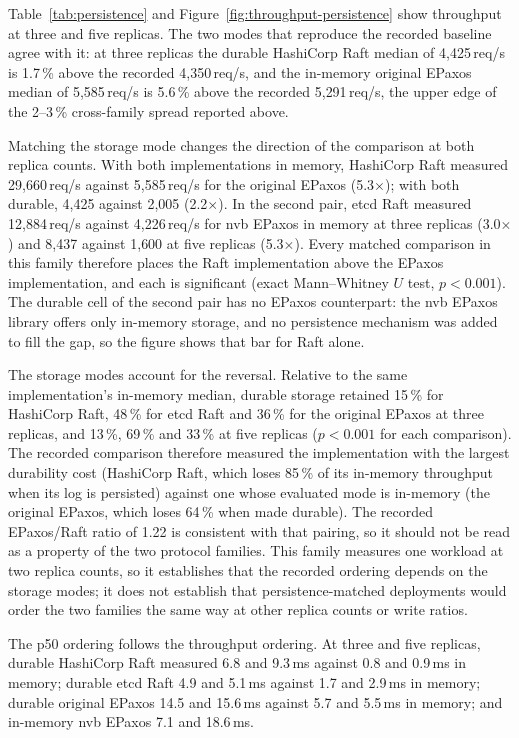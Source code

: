 Table~\ref{tab:persistence} and
Figure~\ref{fig:throughput-persistence} show throughput at three and five
replicas. The two modes that reproduce the recorded baseline agree with it: at
three replicas the durable HashiCorp Raft median of 4{,}425\,req/s is
1.7\,\% above the recorded 4{,}350\,req/s, and the in-memory original EPaxos
median of 5{,}585\,req/s is 5.6\,\% above the recorded 5{,}291\,req/s, the
upper edge of the 2--3\,\% cross-family spread reported above.

Matching the storage mode changes the direction of the comparison at both
replica counts. With both implementations in memory, HashiCorp Raft measured
29{,}660\,req/s against 5{,}585\,req/s for the original EPaxos (5.3$\times$);
with both durable, 4{,}425 against 2{,}005 (2.2$\times$). In the second pair,
etcd Raft measured 12{,}884\,req/s against 4{,}226\,req/s for nvb EPaxos in
memory at three replicas (3.0$\times$) and 8{,}437 against 1{,}600 at five
replicas (5.3$\times$). Every matched comparison in this family therefore
places the Raft implementation above the EPaxos implementation, and each is
significant (exact Mann--Whitney $U$ test, $p<0.001$). The durable cell of the
second pair has no EPaxos counterpart: the nvb EPaxos library offers only
in-memory storage, and no persistence mechanism was added to fill the gap, so
the figure shows that bar for Raft alone.

The storage modes account for the reversal. Relative to the same
implementation's in-memory median, durable storage retained 15\,\% for
HashiCorp Raft, 48\,\% for etcd Raft and 36\,\% for the original EPaxos at
three replicas, and 13\,\%, 69\,\% and 33\,\% at five replicas ($p<0.001$ for
each comparison). The recorded comparison therefore measured the
implementation with the largest durability cost (HashiCorp Raft, which loses
85\,\% of its in-memory throughput when its log is persisted) against one
whose evaluated mode is in-memory (the original EPaxos, which loses 64\,\%
when made durable). The recorded EPaxos/Raft ratio of 1.22 is consistent with
that pairing, so it should not be read as a property of the two protocol
families. This family measures one workload at two replica counts, so it
establishes that the recorded ordering depends on the storage modes; it does
not establish that persistence-matched deployments would order the two
families the same way at other replica counts or write ratios.

The p50 ordering follows the throughput ordering. At three and five replicas,
durable HashiCorp Raft measured 6.8 and 9.3\,ms against 0.8 and 0.9\,ms in
memory; durable etcd Raft 4.9 and 5.1\,ms against 1.7 and 2.9\,ms in memory;
durable original EPaxos 14.5 and 15.6\,ms against 5.7 and 5.5\,ms in memory;
and in-memory nvb EPaxos 7.1 and 18.6\,ms.

